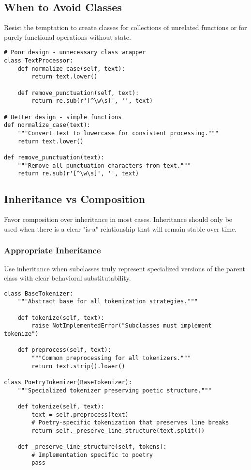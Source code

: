 \documentclass[11pt,a4paper]{article}
\begin{document}
\subsection{When to Avoid Classes}

Resist the temptation to create classes for collections of unrelated functions or for purely functional operations without state.

\begin{lstlisting}[caption=Avoid classes for stateless operations]
# Poor design - unnecessary class wrapper
class TextProcessor:
    def normalize_case(self, text):
        return text.lower()
    
    def remove_punctuation(self, text):
        return re.sub(r'[^\w\s]', '', text)

# Better design - simple functions
def normalize_case(text):
    """Convert text to lowercase for consistent processing."""
    return text.lower()

def remove_punctuation(text):
    """Remove all punctuation characters from text."""
    return re.sub(r'[^\w\s]', '', text)
\end{lstlisting}

\subsection{Inheritance vs Composition}

Favor composition over inheritance in most cases. Inheritance should only be used when there is a clear "is-a" relationship that will remain stable over time.

\subsubsection{Appropriate Inheritance}

Use inheritance when subclasses truly represent specialized versions of the parent class with clear behavioral substitutability.

\begin{lstlisting}[caption=Appropriate inheritance for specialization]
class BaseTokenizer:
    """Abstract base for all tokenization strategies."""
    
    def tokenize(self, text):
        raise NotImplementedError("Subclasses must implement tokenize")
    
    def preprocess(self, text):
        """Common preprocessing for all tokenizers."""
        return text.strip().lower()

class PoetryTokenizer(BaseTokenizer):
    """Specialized tokenizer preserving poetic structure."""
    
    def tokenize(self, text):
        text = self.preprocess(text)
        # Poetry-specific tokenization that preserves line breaks
        return self._preserve_line_structure(text.split())
    
    def _preserve_line_structure(self, tokens):
        # Implementation specific to poetry
        pass
\end{lstlisting}
\end{document}

